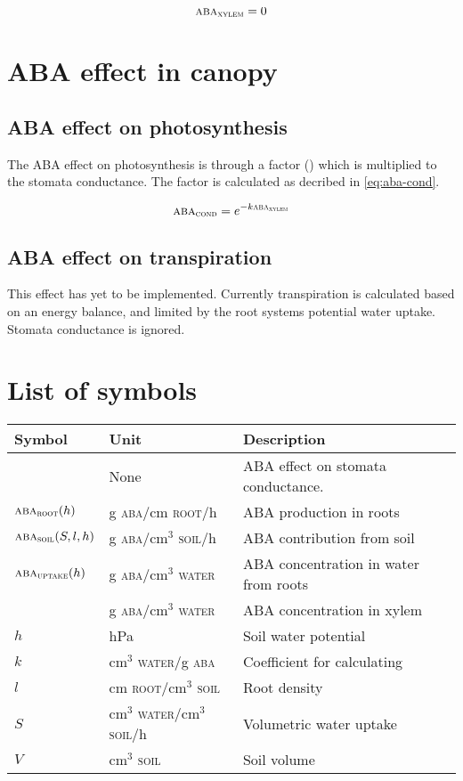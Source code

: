 \documentclass[a4paper,11pt,twoside]{article}
\newcommand{\aba}[1]{\text{\textsc{aba}$_\text{\textsc{#1}}$}}
\begin{document}
\begin{equation}
  \aba{xylem} = 0
  \label{eq:aba_none}
\end{equation}

\section{ABA effect in canopy}

\subsection{ABA effect on photosynthesis}

The ABA effect on photosynthesis is through a factor (\aba{cond})
which is multiplied to the stomata conductance.  The factor is
calculated as decribed in \eqref{eq:aba-cond}.

\begin{equation}
  \aba{cond} = e^{-k \aba{xylem}}
  \label{eq:aba-cond}
\end{equation}

\subsection{ABA effect on transpiration}

This effect has yet to be implemented.  Currently transpiration is
calculated based on an energy balance, and limited by the root systems
potential water uptake.  Stomata conductance is ignored.

\section{List of symbols}

\begin{tabular}{lll}
  Symbol & Unit & Description\\\hline
  \aba{cond} & None
    & ABA effect on stomata conductance.\\
  $\aba{root}(h)$ & g \textsc{aba}/cm \textsc{root}/h
    & ABA production in roots\\
  $\aba{soil}(S,l,h)$ & g \textsc{aba}/cm$^3$ \textsc{soil}/h
    & ABA contribution from soil\\
  $\aba{uptake}(h)$ & g \textsc{aba}/cm$^3$ \textsc{water}
    & ABA concentration in water from roots\\
  \aba{xylem} & g \textsc{aba}/cm$^3$ \textsc{water}
    & ABA concentration in xylem\\
  $h$    & hPa              
    & Soil water potential\\
  $k$    & cm$^3$ \textsc{water}/g \textsc{aba}
    & Coefficient for calculating \aba{cond}\\
  $l$    & cm \textsc{root}/cm$^3$ \textsc{soil} 
    & Root density\\
  $S$    & cm$^3$ \textsc{water}/cm$^3$ \textsc{soil}/h
    & Volumetric water uptake\\
  $V$    & cm$^3$ \textsc{soil}
    & Soil volume\\
\end{tabular}
\end{document}
